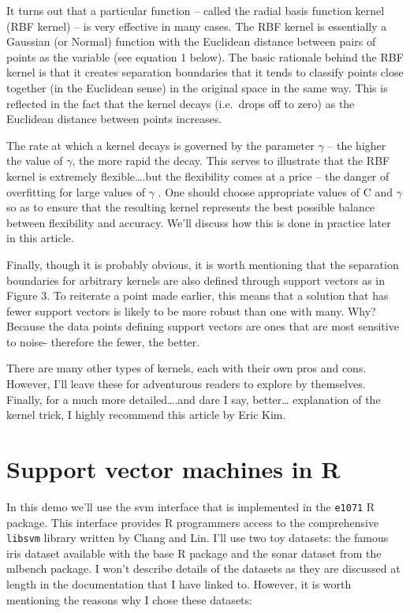 \documentclass[]{book}
\begin{document}
It turns out that a particular function -- called the radial basis function kernel (RBF kernel) -- is very effective in many cases. The RBF kernel is essentially a Gaussian (or Normal) function with the Euclidean distance between pairs of points as the variable (see equation 1 below). The basic rationale behind the RBF kernel is that it creates separation boundaries that it tends to classify points close together (in the Euclidean sense) in the original space in the same way. This is reflected in the fact that the kernel decays (i.e.~drops off to zero) as the Euclidean distance between points increases.

The rate at which a kernel decays is governed by the parameter \(\gamma\) -- the higher the value of \(\gamma\), the more rapid the decay. This serves to illustrate that the RBF kernel is extremely flexible\ldots{}.but the flexibility comes at a price -- the danger of overfitting for large values of \(\gamma\) . One should choose appropriate values of C and \(\gamma\) so as to ensure that the resulting kernel represents the best possible balance between flexibility and accuracy. We'll discuss how this is done in practice later in this article.

Finally, though it is probably obvious, it is worth mentioning that the separation boundaries for arbitrary kernels are also defined through support vectors as in Figure 3. To reiterate a point made earlier, this means that a solution that has fewer support vectors is likely to be more robust than one with many. Why? Because the data points defining support vectors are ones that are most sensitive to noise- therefore the fewer, the better.

There are many other types of kernels, each with their own pros and cons. However, I'll leave these for adventurous readers to explore by themselves. Finally, for a much more detailed\ldots{}.and dare I say, better\ldots{} explanation of the kernel trick, I highly recommend this article by Eric Kim.

\hypertarget{support-vector-machines-in-r}{%
\section{Support vector machines in R}\label{support-vector-machines-in-r}}

In this demo we'll use the svm interface that is implemented in the \texttt{e1071} R package. This interface provides R programmers access to the comprehensive \texttt{libsvm} library written by Chang and Lin. I'll use two toy datasets: the famous iris dataset available with the base R package and the sonar dataset from the mlbench package. I won't describe details of the datasets as they are discussed at length in the documentation that I have linked to. However, it is worth mentioning the reasons why I chose these datasets:
\end{document}

